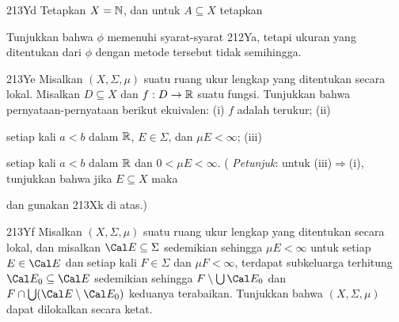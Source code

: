 {\spheader 213Yd Tetapkan $X=\Bbb N$, dan untuk $A\subseteq X$ tetapkan


\noindent Tunjukkan bahwa $\phi$ memenuhi syarat-syarat 212Ya, tetapi ukuran
yang ditentukan dari $\phi$ dengan metode tersebut tidak semihingga.

\spheader 213Ye Misalkan $(X,\Sigma,\mu)$ suatu ruang ukur lengkap yang
ditentukan secara lokal.   Misalkan $D\subseteq X$ dan $f:D\to\Bbb R$ suatu
fungsi.   Tunjukkan bahwa pernyataan-pernyataan berikut ekuivalen:
(i) $f$ adalah terukur;  (ii)


\noindent setiap kali $a<b$ dalam $\Bbb R$, $E\in\Sigma$, dan
$\mu E<\infty$; (iii)


\noindent setiap kali $a<b$ dalam $\Bbb R$ dan $0<\mu E<\infty$.  ({\it
Petunjuk\/}:
untuk (iii)$\Rightarrow$(i), tunjukkan bahwa jika $E\subseteq X$ maka


\noindent dan gunakan 213Xk di atas.)

\spheader 213Yf Misalkan $(X,\Sigma,\mu)$ suatu ruang ukur lengkap yang
ditentukan secara lokal, dan misalkan $\Cal E\subseteq\Sigma$ sedemikian sehingga
$\mu E<\infty$ untuk setiap $E\in\Cal E$ dan setiap kali $F\in\Sigma$ dan
$\mu F<\infty$, terdapat subkeluarga terhitung $\Cal E_0\subseteq\Cal E$
sedemikian sehingga
$F\setminus\bigcup\Cal E_0$ dan $F\cap\bigcup(\Cal E\setminus\Cal E_0)$
keduanya terabaikan.   Tunjukkan bahwa $(X,\Sigma,\mu)$ dapat dilokalkan secara ketat.
}%

